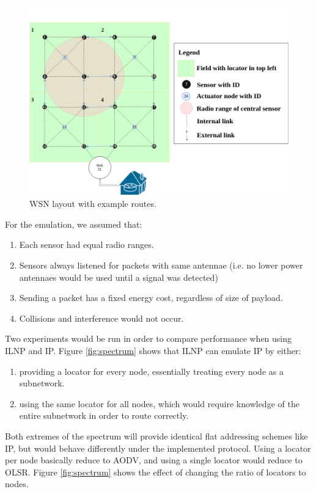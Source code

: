 \documentclass[12pt]{article}
\begin{document}
\begin{figure}[!ht]
	\centering
	\includegraphics[width=\linewidth]{images/layout}
	\caption{WSN layout with example routes.}
	\label{fig:layout}
\end{figure}

For the emulation, we assumed that: 
\begin{enumerate}
    \item Each sensor had equal radio ranges.
    \item Sensors always listened for packets with same antennae (i.e. no lower power antennaes would be used until a signal was detected\cite{offon})
    \item Sending a packet has a fixed energy cost, regardless of size of payload.
    \item Collisions and interference would not occur.
\end{enumerate}

Two experiments would be run in order to compare performance when using ILNP and IP. Figure \ref{fig:spectrum} shows that ILNP can emulate IP by either:
\begin{enumerate}
	\item providing a locator for every node, essentially treating every node as a subnetwork.
	\item using the same locator for all nodes, which would require knowledge of the entire subnetwork in order to route correctly.
\end{enumerate}

Both extremes of the spectrum will provide identical flat addressing schemes like IP, but would behave differently under the implemented protocol. Using a locator per node basically reduce to AODV, and using a single locator would reduce to OLSR. Figure \ref{fig:spectrum} shows the effect of changing the ratio of locators to nodes.
\end{document}

